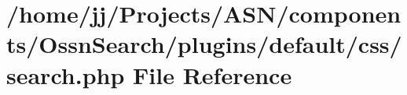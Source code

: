 \hypertarget{components_2_ossn_search_2plugins_2default_2css_2search_8php}{}\section{/home/jj/\+Projects/\+A\+S\+N/components/\+Ossn\+Search/plugins/default/css/search.php File Reference}
\label{components_2_ossn_search_2plugins_2default_2css_2search_8php}
